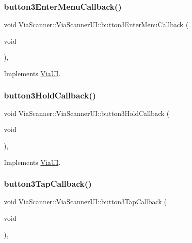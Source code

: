 \subsubsection{\texorpdfstring{button3\+Enter\+Menu\+Callback()}{button3EnterMenuCallback()}}
{\footnotesize\ttfamily void Via\+Scanner\+::\+Via\+Scanner\+U\+I\+::button3\+Enter\+Menu\+Callback (\begin{DoxyParamCaption}\item[{void}]{ }\end{DoxyParamCaption})\hspace{0.3cm}{\ttfamily [override]}, {\ttfamily [virtual]}}



Implements \mbox{\hyperlink{class_via_u_i_a883081e46324dec82ad89f2e77cf4b65}{Via\+UI}}.

\mbox{\label{class_via_scanner_1_1_via_scanner_u_i_ac01a2eda088067d96b7691255d2841c6}} 
\subsubsection{\texorpdfstring{button3\+Hold\+Callback()}{button3HoldCallback()}}
{\footnotesize\ttfamily void Via\+Scanner\+::\+Via\+Scanner\+U\+I\+::button3\+Hold\+Callback (\begin{DoxyParamCaption}\item[{void}]{ }\end{DoxyParamCaption})\hspace{0.3cm}{\ttfamily [override]}, {\ttfamily [virtual]}}



Implements \mbox{\hyperlink{class_via_u_i_a7334aea36cf78afac284dd5e899e8ace}{Via\+UI}}.

\mbox{\label{class_via_scanner_1_1_via_scanner_u_i_ac4c5b6ba60ade672ebe768c9d4849d62}} 
\subsubsection{\texorpdfstring{button3\+Tap\+Callback()}{button3TapCallback()}}
{\footnotesize\ttfamily void Via\+Scanner\+::\+Via\+Scanner\+U\+I\+::button3\+Tap\+Callback (\begin{DoxyParamCaption}\item[{void}]{ }\end{DoxyParamCaption})\hspace{0.3cm}{\ttfamily [override]}, {\ttfamily [virtual]}}




